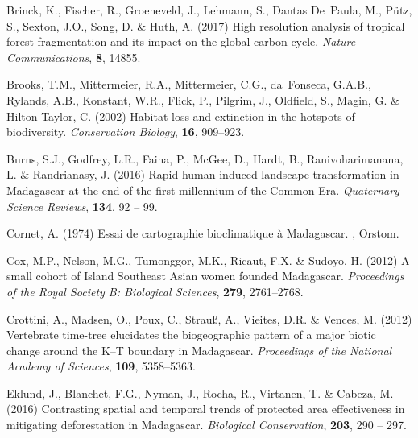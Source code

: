 \documentclass[a4paper, 12pt, leqno]{article} %
\begin{document}
\begin{thebibliography}{55}
Brinck, K., Fischer, R., Groeneveld, J., Lehmann, S., Dantas De~Paula, M.,
  Pütz, S., Sexton, J.O., Song, D. \& Huth, A. (2017) High resolution analysis
  of tropical forest fragmentation and its impact on the global carbon cycle.
\newblock \emph{Nature Communications}, \textbf{8}, 14855.

Brooks, T.M., Mittermeier, R.A., Mittermeier, C.G., da~Fonseca, G.A.B.,
  Rylands, A.B., Konstant, W.R., Flick, P., Pilgrim, J., Oldfield, S., Magin,
  G. \& Hilton-Taylor, C. (2002) Habitat loss and extinction in the hotspots of
  biodiversity.
\newblock \emph{Conservation Biology}, \textbf{16}, 909--923.

Burns, S.J., Godfrey, L.R., Faina, P., McGee, D., Hardt, B., Ranivoharimanana,
  L. \& Randrianasy, J. (2016) {Rapid human-induced landscape transformation in
  Madagascar at the end of the first millennium of the Common Era}.
\newblock \emph{Quaternary Science Reviews}, \textbf{134}, 92 -- 99.

Cornet, A. (1974) {Essai de cartographie bioclimatique à Madagascar}.
\newblock , Orstom.

Cox, M.P., Nelson, M.G., Tumonggor, M.K., Ricaut, F.X. \& Sudoyo, H. (2012) {A
  small cohort of Island Southeast Asian women founded Madagascar}.
\newblock \emph{Proceedings of the Royal Society B: Biological Sciences},
  \textbf{279}, 2761--2768.

Crottini, A., Madsen, O., Poux, C., Strau{\ss}, A., Vieites, D.R. \& Vences, M.
  (2012) {Vertebrate time-tree elucidates the biogeographic pattern of a major
  biotic change around the K--T boundary in Madagascar}.
\newblock \emph{Proceedings of the National Academy of Sciences}, \textbf{109},
  5358--5363.

Eklund, J., Blanchet, F.G., Nyman, J., Rocha, R., Virtanen, T. \& Cabeza, M.
  (2016) {Contrasting spatial and temporal trends of protected area
  effectiveness in mitigating deforestation in Madagascar}.
\newblock \emph{Biological Conservation}, \textbf{203}, 290 -- 297.


\end{thebibliography}
\end{document}
